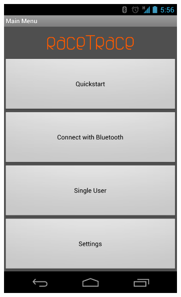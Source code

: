 \begin{figure}

\centering
\begin{subfigure}[b]{0.3\textwidth}
\includegraphics[scale=0.15]{mainMenu}
\end{subfigure}
\qquad
\begin{subfigure}[b]{0.3\textwidth}

\end{subfigure}
\end{figure}
